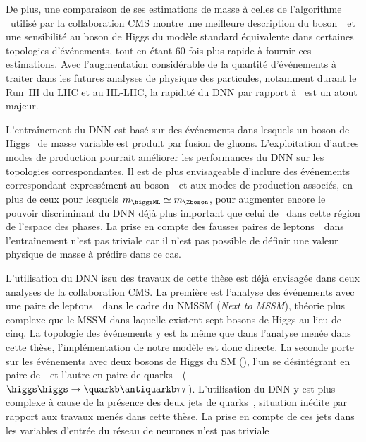 De plus,
une comparaison de ses estimations de masse à celles de l'algorithme \SVFIT\ utilisé par la collaboration CMS montre
une meilleure description du boson~\Zboson\ et une sensibilité au boson de Higgs du modèle standard
équivalente
dans certaines topologies d'événements,
tout en étant 60 fois plus rapide à fournir ces estimations.
Avec l'augmentation considérable de la quantité d'événements à traiter
dans les futures analyses de physique des particules,
notamment durant le Run~III du LHC et au HL-LHC,
la rapidité du DNN par rapport à \SVFIT\
est un atout majeur.
\par
L'entraînement du DNN est basé sur des événements
dans lesquels un boson de Higgs \higgsML\ de masse variable est produit par fusion de gluons.
L'exploitation d'autres modes de production
pourrait améliorer les performances
du DNN sur les topologies correspondantes.
Il est de plus envisageable d'inclure
des événements correspondant expressément au boson~\Zboson\
et aux modes de production associés,
en plus de ceux pour lesquels $m_{\higgsML}\simeq m_{\Zboson}$,
pour augmenter encore le pouvoir discriminant du DNN
déjà plus important que celui de \mTtot\
dans cette région de l'espace des phases.
La prise en compte des fausses paires de leptons~\tau\
dans l'entraînement
n'est pas triviale
car il n'est pas possible de définir une valeur physique de masse à prédire
dans ce cas.
\par
L'utilisation du DNN issu des travaux de cette thèse
est déjà envisagée dans deux analyses de la collaboration CMS.
La première est l'analyse des événements avec une paire de leptons~\tau\
dans le cadre du NMSSM (\emph{Next to MSSM}),
théorie plus complexe que le MSSM dans laquelle existent sept bosons de Higgs au lieu de cinq.
La topologie des événements y est la même que dans l'analyse menée dans cette thèse,
l'implémentation de notre modèle est donc directe.
La seconde porte sur les événements avec deux bosons de Higgs du SM (\higgs),
l'un se désintégrant en paire de~\tau\
et l'autre en paire de quarks~\quarkb\
($\higgs\higgs\to\quarkb\antiquarkb\tau\tau$).
L'utilisation du DNN y est plus complexe à cause de la présence des deux jets de quarks~\quarkb,
situation inédite par rapport aux travaux menés dans cette thèse.
La prise en compte de ces jets dans les variables d'entrée du réseau de neurones n'est pas triviale
